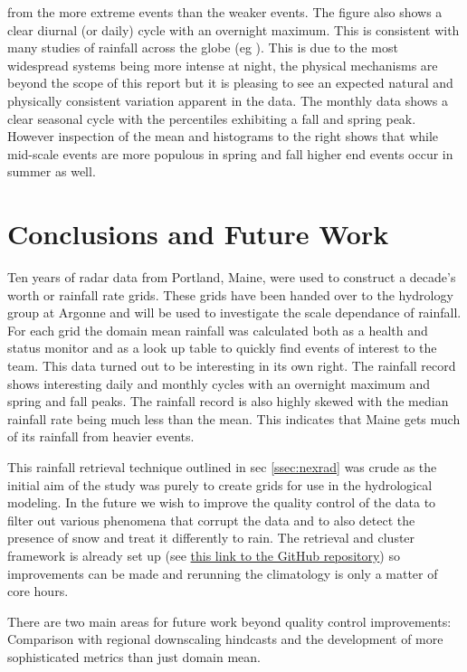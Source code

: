 \documentclass[twocol]{ametsoc}
\begin{document}
from the more extreme events than the weaker events. 
The figure also shows a clear diurnal (or daily) cycle with an overnight maximum. This is consistent with many studies 
of rainfall across the globe (eg \cite{nesbitt_diurnal_2003}). This is due to the most widespread systems being more 
intense at night, the physical mechanisms are beyond the scope of this report but it is pleasing to see an expected 
natural and physically consistent variation apparent in the data. 
The monthly data shows a clear seasonal cycle with the percentiles exhibiting a fall and spring peak. However inspection
 of the mean and histograms to the right shows that while mid-scale events are more populous in spring and fall higher end 
 events occur in summer as well. 

\section{Conclusions and Future Work}
Ten years of radar data from Portland, Maine, were used to construct a decade's worth or rainfall rate grids. These grids have 
been handed over to the hydrology group at Argonne and will be used to investigate the scale dependance of rainfall. For each 
grid the domain mean rainfall was calculated both as a health and status monitor and as a look up table to quickly find events of 
interest to the team. This data turned out to be interesting in its own right. The rainfall record shows interesting daily and monthly 
cycles with an overnight maximum  and spring and fall peaks. The rainfall record is also highly skewed with the median rainfall rate
being much less than the mean. This indicates that Maine gets much of its rainfall from heavier events. 

This rainfall retrieval technique outlined in sec \ref{ssec:nexrad} was crude as the initial aim of the study was purely to create grids 
for use in the hydrological modeling.  In the future we wish to improve the quality control of the data to filter out various phenomena 
that corrupt the data and to also detect the presence of snow and treat it differently to rain. The retrieval and cluster framework is 
already set up (see \href{https://github.com/scollis/high_resolution_hydrology}{this link to the GitHub repository})
 so improvements can be made and rerunning the climatology is only a matter of core hours.
 
There are two main areas for future work beyond quality control improvements: Comparison with regional downscaling hindcasts and 
the development of more sophisticated metrics than just domain mean. 
\end{document}
